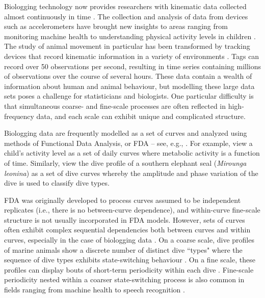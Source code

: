 
Biologging technology now provides researchers with kinematic data collected almost continuously in time \citep{Hooten:2017}.
The collection and analysis of data from devices such as accelerometers have brought new insights to areas ranging from monitoring machine health \citep{Getman:2009} to understanding physical activity levels in children \citep{Morris:2007}. The study of animal movement in particular has been transformed by tracking devices that record kinematic information in a variety of environments \citep{Borger:2020,Dot:2016b}. Tags can record over 50 observations per second, resulting in time series containing millions of observations over the course of several hours. %
These data contain a wealth of information about human and animal behaviour, but modelling these large data sets poses a challenge for statisticians and biologists. One particular difficulty is that simultaneous coarse- and fine-scale processes are often reflected in high-frequency data, and each scale can exhibit unique and complicated structure.

Biologging data are frequently modelled as a set of curves and analyzed using methods of Functional Data Analysis, or FDA -- see, e.g., \citet{Ramsay:2005}. For example, \citet{Morris:2007} view a child's activity level as a set of daily curves where metabolic activity is a function of time. Similarly, \citet{Fu:2017} view the dive profile of a southern elephant seal (\textit{Mirounga leonina}) as a set of dive curves whereby the amplitude and phase variation of the dive is used to classify dive types.

FDA was originally developed to process curves assumed to be independent replicates (i.e., there is no between-curve dependence), and within-curve fine-scale structure is not usually incorporated in FDA models. However, sets of curves often exhibit complex sequential dependencies both between curves and within curves, especially in the case of biologging data \citep{Barajas:2017}.
On a coarse scale, dive profiles of marine animals show a discrete number of distinct dive ``types"
where the sequence of dive types exhibits state-switching behaviour \citep{Tennessen:2019b}. On a fine scale, these profiles can display bouts of short-term periodicity within each dive \citep{Adam:2019}. Fine-scale periodicity nested within a coarser state-switching process is also common in fields ranging from machine health \citep{Xin:2018,Lucero:2019} to speech recognition \citep{Juang:1991}. 


